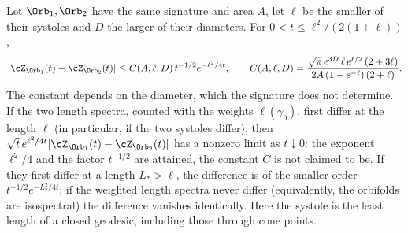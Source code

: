 %


\item Let $\Orb_1,\Orb_2$ have the same signature and area $A$, let $\ell$ be the smaller of their
systoles and $D$ the larger of their diameters. For $0<t\le\ell^2/(2(1+\ell))$,
\[
  |\cZ_{\Orb_1}(t)-\cZ_{\Orb_2}(t)|\le C(A,\ell,D)\,t^{-1/2}e^{-\ell^2/4t},\qquad
  C(A,\ell,D)=\frac{\sqrt\pi\,e^{3D}\,\ell\,e^{\ell/2}\,(2+3\ell)}{2A\,(1-e^{-\ell})\,(2+\ell)} .
\]
The constant depends on the diameter, which the signature does not determine. If the two length
spectra, counted with the weights $\ell(\gamma_0)$, first differ at the length $\ell$ (in particular,
if the two systoles differ), then $\sqrt t\,e^{\ell^2/4t}|\cZ_{\Orb_1}(t)-\cZ_{\Orb_2}(t)|$ has a
nonzero limit as $t\downarrow0$: the exponent $\ell^2/4$ and the factor $t^{-1/2}$ are attained,
the constant $C$ is not claimed to be. If they first differ at a length $L_*>\ell$, the difference
is of the smaller order $t^{-1/2}e^{-L_*^2/4t}$; if the weighted length spectra never differ
(equivalently, the orbifolds are isospectral) the difference vanishes identically. Here the
systole is the least length of a closed geodesic, including those through cone points.


%
%
%

